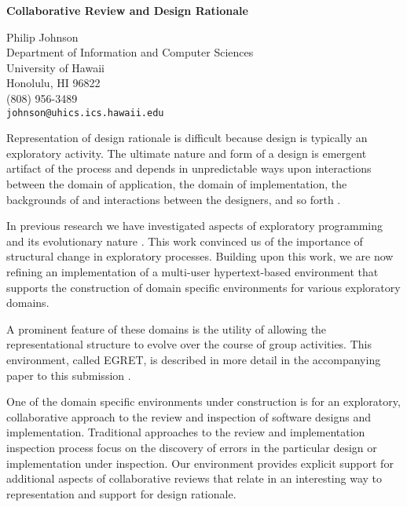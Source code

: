 



\begin{center}

{\Large\bf Collaborative Review and Design Rationale} 

{\large Philip Johnson}\\
Department of Information and Computer Sciences\\ 
University of Hawaii\\ 
Honolulu, HI 96822\\
(808) 956-3489\\
{\tt johnson@uhics.ics.hawaii.edu}
\end{center}

Representation of design rationale is difficult because design is
typically an exploratory activity.  The ultimate nature and form of a
design is emergent artifact of the process and depends in
unpredictable ways upon interactions between the domain of
application, the domain of implementation, the backgrounds of and
interactions between the designers, and so forth \cite{exploratory}.

In previous research we have investigated aspects of exploratory
programming and its evolutionary nature \cite{johnson}.  This work
convinced us of the importance of structural change in exploratory
processes.  Building upon this work, we are now refining an
implementation of a multi-user hypertext-based environment that
supports the construction of domain specific environments for various
exploratory domains.

A prominent feature of these domains is the utility of allowing the
representational structure to evolve over the course of group
activities.  This environment, called EGRET, is described in more
detail in the accompanying paper to this submission \cite{Egret}.

One of the domain specific environments under construction is for an
exploratory, collaborative approach to the review and inspection of
software designs and implementation.  Traditional approaches to the
review and implementation inspection process focus on the discovery of
errors in the particular design or implementation under inspection.
Our environment provides explicit support for additional aspects of
collaborative reviews that relate in an interesting way to
representation and support for design rationale.

